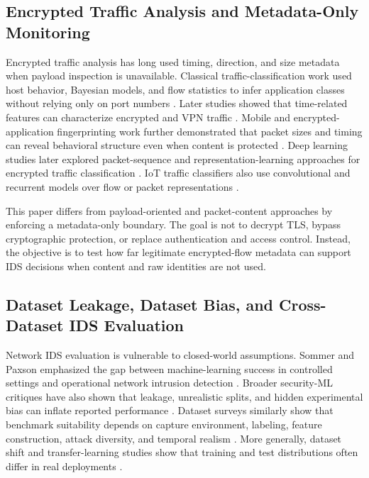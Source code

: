 \documentclass[lettersize,journal]{IEEEtran}
\begin{document}
\subsection{Encrypted Traffic Analysis and Metadata-Only Monitoring}
Encrypted traffic analysis has long used timing, direction, and size metadata when payload inspection is unavailable. Classical traffic-classification work used host behavior, Bayesian models, and flow statistics to infer application classes without relying only on port numbers \cite{karagiannis2005blinc,moore2005bayesian}. Later studies showed that time-related features can characterize encrypted and VPN traffic \cite{drapergil2016vpn}. Mobile and encrypted-application fingerprinting work further demonstrated that packet sizes and timing can reveal behavioral structure even when content is protected \cite{conti2016android,taylor2016appscanner}. Deep learning studies later explored packet-sequence and representation-learning approaches for encrypted traffic classification \cite{lotfollahi2020deeppacket,rezaei2019overview,aceto2019mimetic,wang2017encryptedcnn}. IoT traffic classifiers also use convolutional and recurrent models over flow or packet representations \cite{lopezmartin2017traffic,sivanathan2019iotdevices}.

This paper differs from payload-oriented and packet-content approaches by enforcing a metadata-only boundary. The goal is not to decrypt TLS, bypass cryptographic protection, or replace authentication and access control. Instead, the objective is to test how far legitimate encrypted-flow metadata can support IDS decisions when content and raw identities are not used.

\subsection{Dataset Leakage, Dataset Bias, and Cross-Dataset IDS Evaluation}
Network IDS evaluation is vulnerable to closed-world assumptions. Sommer and Paxson emphasized the gap between machine-learning success in controlled settings and operational network intrusion detection \cite{sommer2010outside}. Broader security-ML critiques have also shown that leakage, unrealistic splits, and hidden experimental bias can inflate reported performance \cite{arp2022dosdonts,pendlebury2019tesseract}. Dataset surveys similarly show that benchmark suitability depends on capture environment, labeling, feature construction, attack diversity, and temporal realism \cite{ring2019survey}. More generally, dataset shift and transfer-learning studies show that training and test distributions often differ in real deployments \cite{quionero2009datasetshift,pan2010transfer}.
\end{document}
